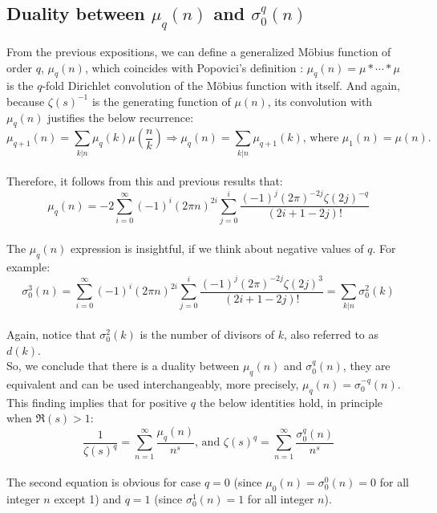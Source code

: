 \documentclass[12pt]{article}
\newcommand*{\citesup}[1]{%
\begingroup
\color{Green}
\cite{#1}%
\endgroup
\ignorespacesafterend
}
\begin{document}
\subsection{Duality between $\mu_q(n)$ and $\sigma^q_0(n)$} \label{Dual}
From the previous expositions, we can define a generalized M\"{o}bius function of order $q$, $\mu_{q}(n)$, which coincides with Popovici's definition\citesup{Popovici}: $\mu_{q}(n)=\mu *\cdots *\mu$ is the $q$-fold Dirichlet convolution of the M\"{o}bius function with itself. And again, because $\zeta(s)^{-1}$ is the generating function of $\mu(n)$, its convolution with $\mu_q(n)$  justifies the below recurrence:
\begin{equation} \label{eq:tests} \nonumber
\mu_{q+1}(n)=\sum_{k|n}\mu_q(k)\mu\left(\frac{n}{k}\right) \Rightarrow \mu_{q}(n)=\sum_{k|n}\mu_{q+1}(k) \text{, where }\mu_1(n)=\mu(n)\text{.}
\end{equation}\\
\indent Therefore, it follows from this and previous results that:
\begin{equation} \nonumber
\mu_{q}(n)=-2\sum_{i=0}^{\infty} (-1)^i (2\pi n)^{2i}\sum_{j=0}^{i}\frac{(-1)^j (2\pi)^{-2j}\zeta(2j)^{-q}}{(2i+1-2j)!}
\end{equation}\\
\indent The $\mu_q(n)$ expression is insightful, if we think about negative values of $q$. For example:
\begin{equation} \nonumber
\sigma^3_0(n)=\sum_{i=0}^{\infty} (-1)^i (2\pi n)^{2i}\sum_{j=0}^{i} \frac{(-1)^j (2\pi)^{-2j}\zeta(2j)^3}{(2i+1-2j)!}=\sum_{k|n}\sigma^2_0(k)
\end{equation}\\
\indent Again, notice that $\sigma^2_0(k)$ is the number of divisors of $k$, also referred to as $d(k)$.\\

So, we conclude that there is a duality between $\mu_q(n)$ and $\sigma^q_0(n)$, they are equivalent and can be used interchangeably, more precisely, $\mu_{q}(n)=\sigma^{-q}_0(n)$.\\

This finding implies that for positive $q$ the below identities hold, in principle when $\Re{(s)}>1$:
\begin{equation} \nonumber
\frac{1}{\zeta(s)^q}=\sum_{n=1}^{\infty}\frac{\mu_{q}(n)}{n^{s}} \text{, and } \zeta(s)^{q}=\sum_{n=1}^{\infty} \frac{\sigma^q_0(n)}{n^{s}}
\end{equation}\\
\indent The second equation is obvious for case $q=0$ (since $\mu_{0}(n)=\sigma^0_0(n)=0$ for all integer $n$ except 1) and $q=1$ (since $\sigma^1_0(n)=1$ for all integer $n$). 
\end{document}
